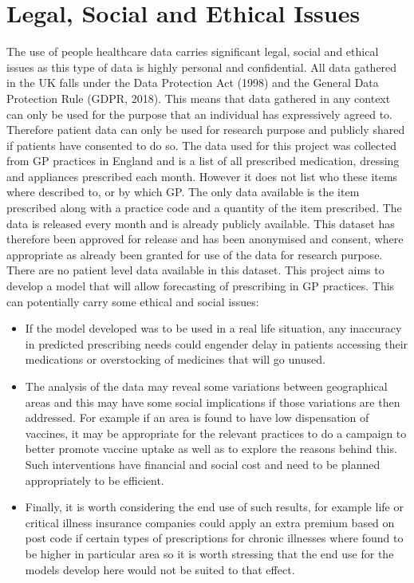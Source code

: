 \section{Legal, Social and Ethical Issues}
The use of people healthcare data carries significant legal, social and ethical issues as this type of data is highly personal and confidential. 
All data gathered in the UK falls under the Data Protection Act (1998) and the General Data Protection Rule (GDPR, 2018). This means that data gathered in any context can only be used for the purpose that an individual has expressively agreed to. Therefore patient data can only be used for research purpose and publicly shared if patients have consented to do so. 
The data used for this project was collected from GP practices in England and is a list of all prescribed medication, dressing and appliances prescribed each month. However it does not list who these items where described to, or by which GP. The only data available is the item prescribed along with a practice code and a quantity of the item prescribed. The data is released every month and is already publicly available. This dataset has therefore been approved for release and has been anonymised and consent, where appropriate as already been granted for use of the data for research purpose.
There are no patient level data available in this dataset.
This project aims to develop a model that will allow forecasting of prescribing in GP practices. This can potentially carry some ethical and social issues:
\begin{itemize}
    \item If the model developed was to be used in a real life situation, any inaccuracy in predicted prescribing needs could engender delay in patients accessing their medications or overstocking of medicines that will go unused.
    \item The analysis of the data may reveal some variations between geographical areas and this may have some social implications if those variations are then addressed. For example if an area is found to have low dispensation of vaccines, it may be appropriate for the relevant practices to do a campaign to better promote vaccine uptake as well as to explore the reasons behind this. Such interventions have financial and social cost and need to be planned appropriately to be efficient.
    \item Finally, it is worth considering the end use of such results, for example life or critical illness insurance companies could apply an extra premium based on post code if certain types of prescriptions for chronic illnesses where found to be higher in particular area so it is worth stressing that the end use for the models develop here would not be suited to that effect.
\end{itemize}

